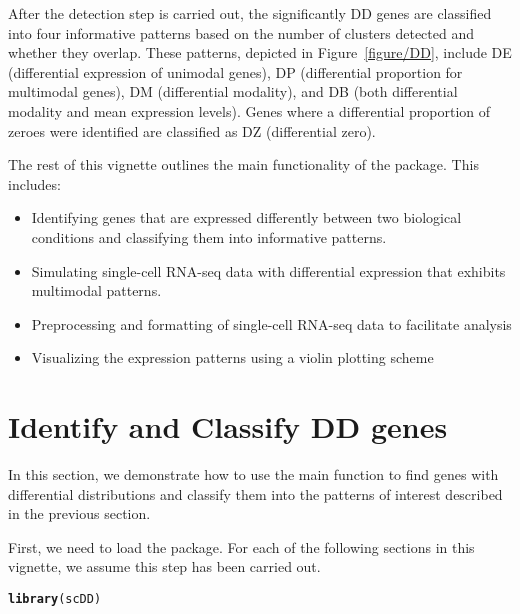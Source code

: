 \documentclass{article}\usepackage[]{graphicx}\usepackage[]{color}
\makeatletter
\newcommand{\hlstd}[1]{\textcolor[rgb]{0.345,0.345,0.345}{#1}}%
\newcommand{\hlkwd}[1]{\textcolor[rgb]{0.737,0.353,0.396}{\textbf{#1}}}%
\newenvironment{kframe}{%
 \def\at@end@of@kframe{}%
 \ifinner\ifhmode%
  \def\at@end@of@kframe{\end{minipage}}%
  \begin{minipage}{\columnwidth}%
 \fi\fi%
 \def\FrameCommand##1{\hskip\@totalleftmargin \hskip-\fboxsep
 \colorbox{shadecolor}{##1}\hskip-\fboxsep
     \hskip-\linewidth \hskip-\@totalleftmargin \hskip\columnwidth}%
 \MakeFramed {\advance\hsize-\width
   \@totalleftmargin\z@ \linewidth\hsize
   \@setminipage}}%
 {\par\unskip\endMakeFramed%
 \at@end@of@kframe}
\newenvironment{knitrout}{}{} %
\makeatother
\begin{document}
After the detection step is carried out, the significantly DD genes are classified into four informative patterns based on the number of clusters detected and whether they overlap.  These patterns, depicted in Figure~\ref{figure/DD}, include DE (differential expression of unimodal genes), DP (differential proportion for multimodal genes), DM (differential modality), and DB (both differential modality and mean expression levels).  Genes where a differential proportion of zeroes were identified are classified as DZ (differential zero).


The rest of this vignette outlines the main functionality of the  package.  This includes:

\begin{itemize}
  \item Identifying genes that are expressed differently between two biological conditions and classifying them into informative patterns.
  \item Simulating single-cell RNA-seq data with differential expression that exhibits multimodal patterns.
  \item Preprocessing and formatting of single-cell RNA-seq data to facilitate analysis
  \item Visualizing the expression patterns using a violin plotting scheme
\end{itemize}

\section{Identify and Classify DD genes}
In this section, we demonstrate how to use the main function  to find genes with differential distributions and classify them into the patterns of interest described in the previous section. 

First, we need to load the  package.  For each of the following sections in this vignette, we assume this step has been carried out.
\begin{knitrout}
\color{fgcolor}\begin{kframe}
\begin{alltt}
\hlkwd{library}\hlstd{(scDD)}
\end{alltt}
\end{kframe}
\end{knitrout}
\end{document}
